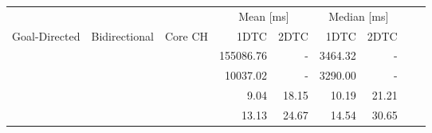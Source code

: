 \begin{tabular}{cccrrrrrr}
	\toprule
	              &               &         & \multicolumn{2}{c}{Mean [\si{\milli\second}]} & \multicolumn{2}{c}{Median [\si{\milli\second}]}               \\
	Goal-Directed & Bidirectional & Core CH & 1DTC                                          & 2DTC                                            & 1DTC & 2DTC \\
	\midrule
	\cmark        & \xmark        & \xmark  & 155086.76                                             & -                                               & 3464.32    & -    \\
	\cmark        & \cmark        & \xmark  & 10037.02                                             & -                                               & 3290.00    & -    \\
	\xmark        & \cmark        & \cmark  & 9.04                                             & 18.15                                               & 10.19    & 21.21    \\
	\cmark        & \cmark        & \cmark  & 13.13                                             & 24.67                                               & 14.54    & 30.65    \\
	\bottomrule
\end{tabular}